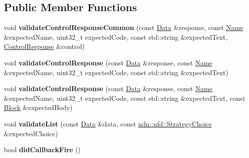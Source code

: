\subsection*{Public Member Functions}
\begin{DoxyCompactItemize}
\item 
void {\bfseries validate\+Control\+Response\+Common} (const \hyperlink{classndn_1_1Data}{Data} \&response, const \hyperlink{classndn_1_1Name}{Name} \&expected\+Name, uint32\+\_\+t expected\+Code, const std\+::string \&expected\+Text, \hyperlink{classndn_1_1mgmt_1_1ControlResponse}{Control\+Response} \&control)\hypertarget{classnfd_1_1tests_1_1StrategyChoiceManagerFixture_aec2989ee363608921775aa98694b1289}{}\label{classnfd_1_1tests_1_1StrategyChoiceManagerFixture_aec2989ee363608921775aa98694b1289}

\item 
void {\bfseries validate\+Control\+Response} (const \hyperlink{classndn_1_1Data}{Data} \&response, const \hyperlink{classndn_1_1Name}{Name} \&expected\+Name, uint32\+\_\+t expected\+Code, const std\+::string \&expected\+Text)\hypertarget{classnfd_1_1tests_1_1StrategyChoiceManagerFixture_aa23bdca45e6bd1396684cff201e0b710}{}\label{classnfd_1_1tests_1_1StrategyChoiceManagerFixture_aa23bdca45e6bd1396684cff201e0b710}

\item 
void {\bfseries validate\+Control\+Response} (const \hyperlink{classndn_1_1Data}{Data} \&response, const \hyperlink{classndn_1_1Name}{Name} \&expected\+Name, uint32\+\_\+t expected\+Code, const std\+::string \&expected\+Text, const \hyperlink{classndn_1_1Block}{Block} \&expected\+Body)\hypertarget{classnfd_1_1tests_1_1StrategyChoiceManagerFixture_a7510b46230b6ba16aadaf7f6b2487d00}{}\label{classnfd_1_1tests_1_1StrategyChoiceManagerFixture_a7510b46230b6ba16aadaf7f6b2487d00}

\item 
void {\bfseries validate\+List} (const \hyperlink{classndn_1_1Data}{Data} \&data, const \hyperlink{classndn_1_1nfd_1_1StrategyChoice}{ndn\+::nfd\+::\+Strategy\+Choice} \&expected\+Choice)\hypertarget{classnfd_1_1tests_1_1StrategyChoiceManagerFixture_a8e13b5272f5c1adf323be475fa5a65bc}{}\label{classnfd_1_1tests_1_1StrategyChoiceManagerFixture_a8e13b5272f5c1adf323be475fa5a65bc}

\item 
bool {\bfseries did\+Callback\+Fire} ()\hypertarget{classnfd_1_1tests_1_1StrategyChoiceManagerFixture_a0a138f720b41f115524b581d8d386a5e}{}\label{classnfd_1_1tests_1_1StrategyChoiceManagerFixture_a0a138f720b41f115524b581d8d386a5e}


\end{DoxyCompactItemize}
